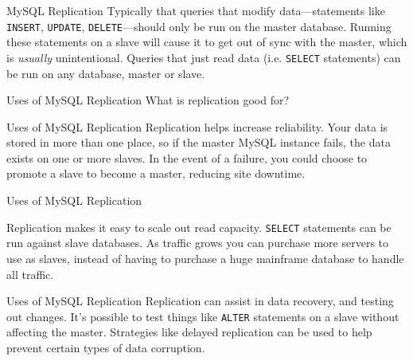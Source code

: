 \documentclass[14pt]{beamer}
\begin{document}
\begin{frame}{MySQL Replication}
  Typically that queries that modify data---statements like \texttt{INSERT},
  \texttt{UPDATE}, \texttt{DELETE}---should only be run on the master
  database. Running these statements on a slave will cause it to get out of sync
  with the master, which is \emph{usually} unintentional.
  \newline
  \newline
  Queries that just read data (i.e. \texttt{SELECT} statements) can be run on any database, master or slave.
\end{frame}

\begin{frame}{Uses of MySQL Replication}
  What is replication good for?
\end{frame}

\begin{frame}{Uses of MySQL Replication}
  Replication helps increase reliability. Your data is stored in more than one
  place, so if the master MySQL instance fails, the data exists on one or more slaves.
  \newline
  \newline
  In the event of a failure, you could choose to promote a slave to become a
  master, reducing site downtime.
\end{frame}

\begin{frame}{Uses of MySQL Replication}

  Replication makes it easy to scale out read capacity.
  \newline
  \newline
  \texttt{SELECT}
  statements can be run against slave databases. As traffic grows you can
  purchase more servers to use as slaves, instead of having to purchase a huge
  mainframe database to handle all traffic.

\end{frame}

\begin{frame}{Uses of MySQL Replication}
  Replication can assist in data recovery, and testing out changes. It's
  possible to test things like \texttt{ALTER} statements on a slave without
  affecting the master.
  \newline
  \newline
  Strategies like delayed replication can be used to help
  prevent certain types of data corruption.
\end{frame}
\end{document}

